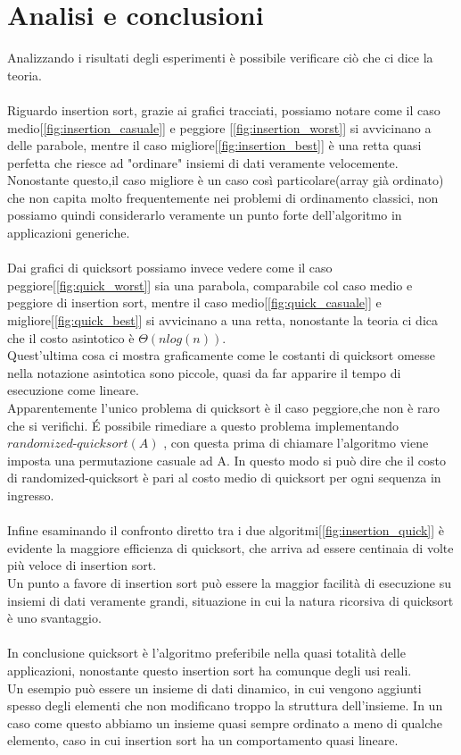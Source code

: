 \documentclass[]{article}
\begin{document}
\section{Analisi e conclusioni}
Analizzando i risultati degli esperimenti è possibile verificare ciò che ci dice la teoria.\\\\
Riguardo insertion sort, grazie ai grafici tracciati, possiamo notare come il caso medio[\ref{fig:insertion_casuale}] e peggiore [\ref{fig:insertion_worst}] si avvicinano a delle parabole, mentre il caso migliore[\ref{fig:insertion_best}] è una retta quasi perfetta che riesce ad "ordinare" insiemi di dati veramente velocemente.\\
Nonostante questo,il caso migliore è un caso così particolare(array già ordinato) che non capita molto frequentemente nei problemi di ordinamento classici, non possiamo quindi considerarlo veramente un punto forte dell'algoritmo in applicazioni generiche.\\\\
Dai grafici di quicksort possiamo invece vedere come il caso peggiore[\ref{fig:quick_worst}] sia una parabola, comparabile col caso medio e peggiore di insertion sort, mentre il caso medio[\ref{fig:quick_casuale}] e migliore[\ref{fig:quick_best}] si avvicinano a una retta, nonostante la teoria ci dica che il costo asintotico è $\Theta(nlog(n))$.\\
Quest'ultima cosa ci mostra graficamente come le costanti di quicksort omesse nella notazione asintotica sono piccole, quasi da far apparire il tempo di esecuzione come lineare.\\
Apparentemente l'unico problema di quicksort è il caso peggiore,che non è raro che si verifichi. \'E possibile rimediare a questo problema implementando $randomized\mbox{-}quicksort(A)$ , con questa prima di chiamare l'algoritmo viene imposta una permutazione casuale ad A. In questo modo si può dire che il costo di randomized-quicksort è pari al costo medio di quicksort per ogni sequenza in ingresso.\\\\
Infine esaminando il confronto diretto tra i due algoritmi[\ref{fig:insertion_quick}] è evidente la maggiore efficienza di quicksort, che arriva ad essere centinaia di volte più veloce di insertion sort.\\
Un punto a favore di insertion sort può essere la maggior facilità di esecuzione su insiemi di dati veramente grandi, situazione in cui la natura ricorsiva di quicksort è uno svantaggio.\\\\
In conclusione quicksort è l'algoritmo preferibile nella quasi totalità delle applicazioni, nonostante questo insertion sort ha comunque degli usi reali.\\
Un esempio può essere un insieme di dati dinamico, in cui vengono aggiunti spesso degli elementi che non modificano troppo la struttura dell'insieme. In un caso come questo abbiamo un insieme quasi sempre ordinato a meno di qualche elemento, caso in cui insertion sort ha un comportamento quasi lineare.
\end{document}
